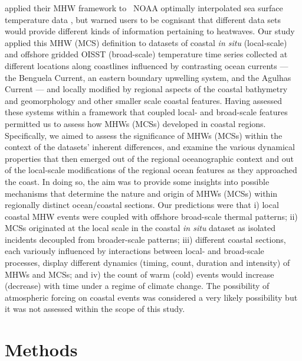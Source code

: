 \documentclass[a4paper,10pt,review]{elsarticle}
\begin{document}
\citet{Hobday2016} applied their MHW framework to \degree~NOAA optimally interpolated sea surface temperature data \citep[hereafter referred to as OISST;][]{Reynolds2007}, but warned users to be cognisant that different data sets would provide different kinds of information pertaining to heatwaves. Our study applied this MHW (MCS) definition to datasets of coastal \emph{in situ} (local-scale) and offshore gridded OISST (broad-scale) temperature time series collected at different locations along coastlines influenced by contrasting ocean currents --- the Benguela Current, an eastern boundary upwelling system, and the Agulhas Current --- and locally modified by regional aspects of the coastal bathymetry and geomorphology and other smaller scale coastal features. Having assessed these systems within a framework that coupled local- and broad-scale features permitted us to assess how MHWs (MCSs) developed in coastal regions. Specifically, we aimed to assess the significance of MHWs (MCSs) within the context of the datasets’ inherent differences, and examine the various dynamical properties that then emerged out of the regional oceanographic context and out of the local-scale modifications of the regional ocean features as they approached the coast. In doing so, the aim was to provide some insights into possible mechanisms that determine the nature and origin of MHWs (MCSs) within regionally distinct ocean/coastal sections. Our predictions were that i) local coastal MHW events were coupled with offshore broad-scale thermal patterns; ii) MCSs originated at the local scale in the coastal \emph{in situ} dataset as isolated incidents decoupled from broader-scale patterns; iii) different coastal sections, each variously influenced by interactions between local- and broad-scale processes, display different dynamics (timing, count, duration and intensity) of MHWs and MCSs; and iv) the count of warm (cold) events would increase (decrease) with time under a regime of climate change. The possibility of atmospheric forcing on coastal events was considered a very likely possibility but it was not assessed within the scope of this study.

\section{Methods}
\end{document}
